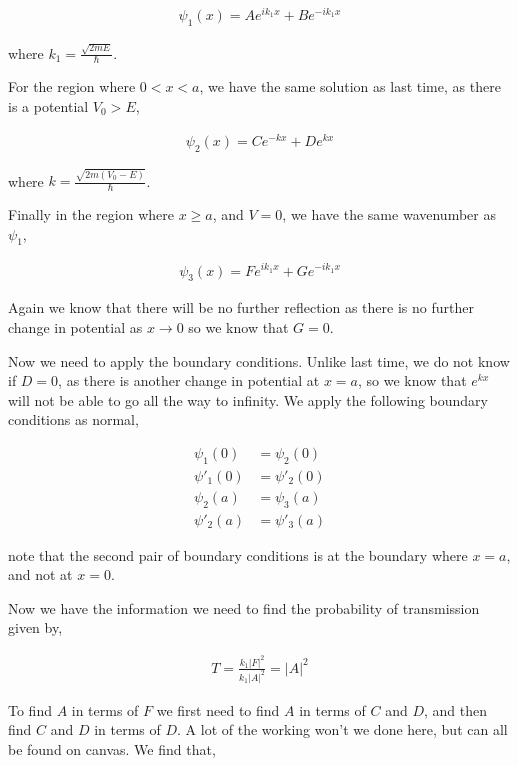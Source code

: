 \documentclass[11pt]{amsart}
\begin{document}
\begin{align*}
  \psi_1(x) = Ae^{ik_1x} + Be^{-ik_1x}
\end{align*}

where $k_1 = \frac{\sqrt{2mE}}{\hbar}$.

For the region where $0 < x < a$, we have the same solution as last time, as there is a potential $V_0 > E$,

\begin{align*}
  \psi_2(x) = Ce^{-kx} + De^{kx}
\end{align*}

where $k = \frac{\sqrt{2m(V_0 - E)}}{\hbar}$.

Finally in the region where $x \geq a$, and $V = 0$, we have the same wavenumber as $\psi_1$,

\begin{align*}
  \psi_3(x) = Fe^{ik_1x} + Ge^{-ik_1x}
\end{align*}

Again we know that there will be no further reflection as there is no further change in potential as $x \to 0$ so we know that $G = 0$.

Now we need to apply the boundary conditions. Unlike last time, we do not know if $D = 0$, as there is another change in potential at $x = a$, so we know that $e^{kx}$ will not be able to go all the way to infinity. We apply the following boundary conditions as normal,

\begin{align*}
  \psi_1(0) &= \psi_2(0) \\
  \psi'_1(0) &= \psi'_2(0) \\
  \psi_2(a) &= \psi_3(a) \\
  \psi'_2(a) &= \psi'_3(a)
\end{align*}

note that the second pair of boundary conditions is at the boundary where $x = a$, and not at $x = 0$.

Now we have the information we need to find the probability of transmission given by,

\begin{align*}
  T = \frac{k_1 {|F|}^2}{k_1 {|A|}^2} = {\left|A\right|}^2
\end{align*}

To find $A$ in terms of $F$ we first need to find $A$ in terms of $C$ and $D$, and then find $C$ and $D$ in terms of $D$. A lot of the working won't we done here, but can all be found on canvas. We find that,
\end{document}
